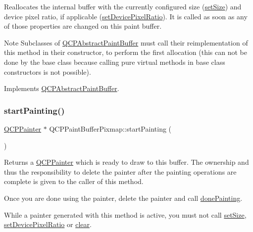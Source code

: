 Reallocates the internal buffer with the currently configured size (\hyperlink{classQCPAbstractPaintBuffer_a8b68c3cd36533f1a4a23b5ce8cd66f01}{set\+Size}) and device pixel ratio, if applicable (\hyperlink{classQCPAbstractPaintBuffer_a555eaad5d5c806420ff35602a1bb68fa}{set\+Device\+Pixel\+Ratio}). It is called as soon as any of those properties are changed on this paint buffer.

\begin{DoxyNote}{Note}
Subclasses of \hyperlink{classQCPAbstractPaintBuffer}{Q\+C\+P\+Abstract\+Paint\+Buffer} must call their reimplementation of this method in their constructor, to perform the first allocation (this can not be done by the base class because calling pure virtual methods in base class constructors is not possible). 
\end{DoxyNote}


Implements \hyperlink{classQCPAbstractPaintBuffer_aee7506a52bd7e5a07c2af27935eb13e7}{Q\+C\+P\+Abstract\+Paint\+Buffer}.

\mbox{\label{classQCPPaintBufferPixmap_a357964ef7d28cfa530338be4e5c93234}} 
\subsubsection{\texorpdfstring{start\+Painting()}{startPainting()}}
{\footnotesize\ttfamily \hyperlink{classQCPPainter}{Q\+C\+P\+Painter} $\ast$ Q\+C\+P\+Paint\+Buffer\+Pixmap\+::start\+Painting (\begin{DoxyParamCaption}{ }\end{DoxyParamCaption})\hspace{0.3cm}{\ttfamily [virtual]}}

Returns a \hyperlink{classQCPPainter}{Q\+C\+P\+Painter} which is ready to draw to this buffer. The ownership and thus the responsibility to delete the painter after the painting operations are complete is given to the caller of this method.

Once you are done using the painter, delete the painter and call \hyperlink{classQCPAbstractPaintBuffer_a41b0dc6e7744f19fae09f8532c207dc1}{done\+Painting}.

While a painter generated with this method is active, you must not call \hyperlink{classQCPAbstractPaintBuffer_a8b68c3cd36533f1a4a23b5ce8cd66f01}{set\+Size}, \hyperlink{classQCPAbstractPaintBuffer_a555eaad5d5c806420ff35602a1bb68fa}{set\+Device\+Pixel\+Ratio} or \hyperlink{classQCPPaintBufferPixmap_a14badbd010a3cde6b55817ccb7b65217}{clear}.


